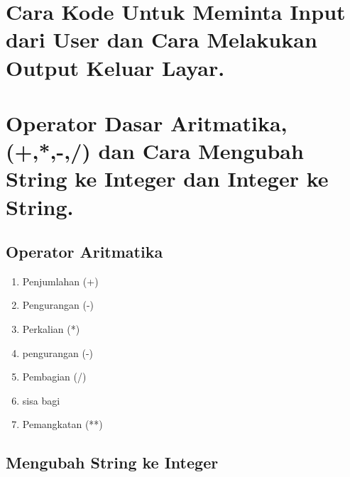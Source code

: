 \documentclass{article}
\begin{document}
\section{Cara Kode Untuk Meminta Input dari User dan Cara Melakukan Output Keluar Layar.}
\usepackage{cara untuk meminta input yaitu dengan menggunakan fungsi operasi input adalah fungsi input() yang akan membuat program kita lebih interaktif, kita dapat meminta input atau masukan dari user sehingga akan lebih menarik. selanjutnya untuk meminta output ke layar Kita dapat menggunakan fungsi print() yang merupakan fungsi bawaan untuk melakukan operasi output}
\section{Operator Dasar Aritmatika,(+,*,-,/) dan Cara Mengubah String ke Integer dan Integer ke String.}
\subsection{Operator Aritmatika}
\usepackage{Operator aritmatika merupakan operator yang paling sering digunakan dalam pemrograman.Operator aritmatika terdiri dari:}
\begin{enumerate}
    \item Penjumlahan (+)
    \item Pengurangan (-)
    \item Perkalian   (*)
    \item pengurangan (-)
    \item Pembagian   (/)
    \item sisa bagi   
    \item Pemangkatan (**)
\end{enumerate}
\subsection{Mengubah String ke Integer}
\usepackage{Tipe data string merupakan tipe data yang dapat menampung sebuah teks. Namun, kita juga dapat mengkonversi/mengubahnya nya ke tipe data lain.salah satunya kita dapat mengubahnya ke integer.Tetapi,Teks yang dapat kita konversi adalah teks yg berisi angka dan tidak boleh ada karakter pun yang berupa huruf.Untuk lebih jelasnya kita lihat dibawah ini...}
\\
\\
\usepackage{
a ='1212' (variabel/angka yang akan di konversi.)\\
integer = int(a) (konversi string ke integer)\\
print(integer) (untuk mencetak hasil.)
}
\end{document}
